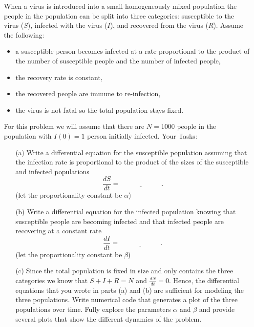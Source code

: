 \begin{problem}
    When a virus is introduced into a small homogeneously mixed population the people in
    the population can be split into three categories: susceptible to the virus ($S$),
    infected with the virus ($I$), and recovered from the virus ($R$).  Assume the
    following:
    \begin{itemize}
        \item a susceptible person becomes infected at a rate proportional to the product
            of the number of susceptible people and the number of infected people,
        \item the recovery rate is constant,
        \item the recovered people are immune to re-infection,
        \item the virus is not fatal so the total population stays fixed.
    \end{itemize}
    For this problem we will assume that there are $N=1000$ people in the population with
    $I(0) = 1$ person initially infected.
    Your Tasks:
    \begin{enumerate}
        \item[(a)] Write a differential equation for the susceptible population assuming
            that the infection rate is proportional to the product of the sizes of the
            susceptible and infected populations
            \[ \frac{dS}{dt} = \underline{\hspace{1in}}. \]
            (let the proportionality constant be $\alpha$)
        \item[(b)] Write a differential equation for the infected population knowing that
            susceptible people are becoming infected and that infected people are
            recovering at a constant rate
            \[ \frac{dI}{dt} = \underline{\hspace{1in}}. \]
            (let the proportionality constant be $\beta$)
        \item[(c)] Since the total population is fixed in size and only contains the three
            categories we know that $S+I+R = N$ and $\frac{dN}{dt} = 0$.  Hence, the
            differential equations that you wrote in parts (a) and (b) are sufficient for
            modeling the three populations.  Write numerical code that generates a plot of
            the three populations over time.  Fully explore the parameters $\alpha$ and
            $\beta$ and provide several plots that show the different dynamics of the
            problem.
    \end{enumerate}
\end{problem}




